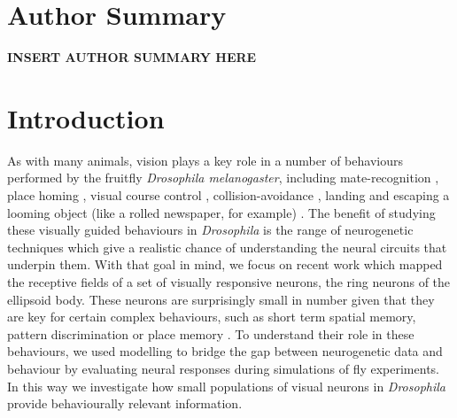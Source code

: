 \documentclass[10pt]{article}
\begin{document}
\section*{Author Summary}
{\bf INSERT AUTHOR SUMMARY HERE}

\section*{Introduction}
As with many animals, vision plays a key role in a number of behaviours performed by the fruitfly \emph{Drosophila melanogaster}, including mate-recognition \cite{Agrawal2014}, place homing \cite{Ofstad2011}, visual course control \cite{Borst2014}, collision-avoidance \cite{Tammero2002}, landing \cite{Tammero2002} and escaping a looming object (like a rolled newspaper, for example) \cite{Card2008}. The benefit of studying these visually guided behaviours in \emph{Drosophila} is the range of neurogenetic techniques which give a realistic chance of understanding the neural circuits that underpin them. With that goal in mind, we focus on recent work \cite{Seelig2013} which mapped the receptive fields of a set of visually responsive neurons, the ring neurons of the ellipsoid body. These neurons are surprisingly small in number given that they are key for certain complex behaviours, such as short term spatial memory, pattern discrimination or place memory \cite{Liu2006,Neuser2008,Seelig2015}. To understand their role in these behaviours, we used modelling to bridge the gap between neurogenetic data and behaviour by evaluating neural responses during simulations of fly experiments. In this way we investigate how small populations of visual neurons in \emph{Drosophila} provide behaviourally relevant information.
\end{document}
